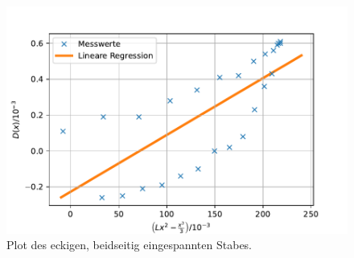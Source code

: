 \begin{figure}[H]
  \centering
  \includegraphics{pictures/Lineare Regression4.pdf}
  \caption{Plot des eckigen, beidseitig eingespannten Stabes.}
  \label{fig:plot3}
\end{figure}
